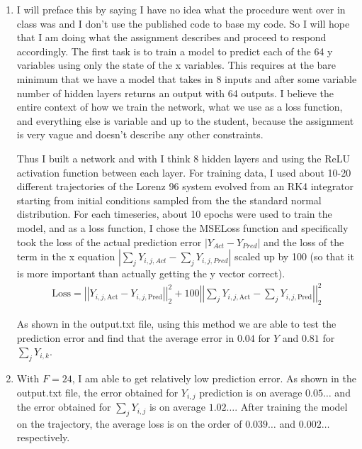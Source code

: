 \documentclass{article}
\begin{document}
\begin{enumerate}[label = \alph*).]
    \item I will preface this by saying I have no idea what the procedure
    went over in class was and I don't use the published code to base my code.
    So I will hope that I am doing what the assignment describes and proceed to
    respond accordingly. The first task is to train a model to predict each of
    the 64 y variables using only the state of the x variables. This requires
    at the bare minimum that we have a model that takes in 8 inputs and
    after some variable number of hidden layers returns an output with 64
    outputs. I believe the entire context of how we train the network, what we
    use as a loss function, and everything else is variable and up to the
    student, because the assignment is very vague and doesn't describe any other
    constraints. 

    Thus I built a network and with I think 8 hidden layers and using the ReLU
    activation function between each layer. For training data, I used about 10-20 different
    trajectories of the Lorenz 96 system evolved from an RK4 integrator starting
    from initial conditions sampled from the the standard normal distribution.
    For each timeseries, about 10 epochs were used to train the model, and as a
    loss function, I chose the MSELoss function and specifically took the loss
    of the actual prediction error $|Y_{Act} - Y_{Pred}|$ and the loss of the
    term in the x equation $|\sum_{j} Y_{i,j, Act} - \sum_jY_{i,j, Pred}|$
    scaled up by 100 (so that it is more important than actually getting the y
    vector correct). 
    \begin{gather*}
        \text{Loss} = \left|\left|Y_{i,j,\text{Act}} -
        Y_{i,j,\text{Pred}}\right|\right|_2^2 +
        100\left|\left|\sum_j Y_{i,j,\text{Act}} - \sum_j Y_{i,j,\text{Pred}}\right|\right|_2^2
    \end{gather*}

    As shown in the output.txt file, using this method we are able to test the
    prediction error and find that the average error in $0.04$ for $Y$ and
    $0.81$ for $\sum_j Y_{i,k}$. 

    \item With $F = 24$, I am able to get relatively low prediction error. As
    shown in the output.txt file, the error obtained for $Y_{i,j}$ prediction is
    on average $0.05\ldots$ and the error obtained for $\sum_j Y_{i,j}$ is on average
    $1.02\ldots$. After training the model on the trajectory, the average loss
    is on the order of $0.039\ldots$ and $0.002\ldots$ respectively. 


\end{enumerate}
\end{document}
